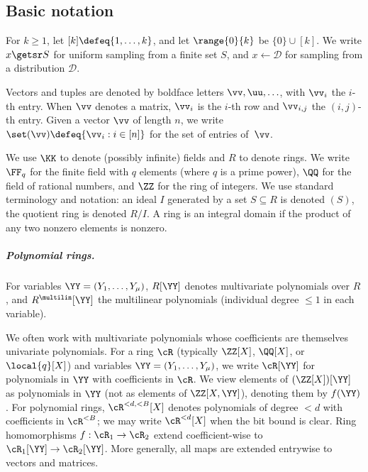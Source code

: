 \subsection{Basic notation}
\label{sec:zinc-crypto-preliminaries}



For $k\geq 1$, let $[k]\defeq \{1,\ldots, k\}$, and let $\range{0}{k}$ be $\{0\}\cup[k]$. We write $x\getsr S$ for uniform sampling from a finite set $S$, and $x\gets\mathcal{D}$ for sampling from a distribution $\mathcal{D}$.


 Vectors and tuples are denoted by boldface letters $\vv, \uu, \ldots$, with $\vv_i$ the $i$-th entry. When $\vv$ denotes a matrix, $\vv_{i}$ is the $i$-th row and $\vv_{i,j}$ the $(i,j)$-th entry.
Given a vector $\vv$ of length $n$, we write $\set(\vv)\defeq\{\vv_i:i\in[n]\}$ for the set of entries of~$\vv$. %




We use $\KK$ to denote (possibly infinite) fields and $R$ to denote rings. We write $\FF_q$ for the finite field with $q$ elements (where $q$ is a prime power), $\QQ$ for the field of rational numbers, and $\ZZ$ for the ring of integers. We use standard terminology and notation: an ideal $I$ generated by a set $S\subseteq R$ is denoted $(S)$, the quotient ring is denoted $R/I$. A ring is an integral domain if the product of any two nonzero elements is nonzero. 



\subparagraph{Polynomial rings.}
For variables $\YY=(Y_1,\ldots, Y_\mu)$, $R[\YY]$ denotes multivariate polynomials over $R$, and $R^{\multilin}[\YY]$ the multilinear polynomials (individual degree $\le 1$ in each variable).

We often work with multivariate polynomials whose coefficients are themselves univariate polynomials. For a ring $\cR$ (typically $\ZZ[X]$, $\QQ[X]$, or $\local{q}[X]$) and variables $\YY=(Y_1,\ldots, Y_\mu)$, we write $\cR[\YY]$ for polynomials in $\YY$ with coefficients in $\cR$. We view elements of $(\ZZ[X])[\YY]$ as polynomials in $\YY$ (not as elements of $\ZZ[X,\YY]$), denoting them by $f(\YY)$.
For polynomial rings, $\cR^{<d, <B}[X]$ denotes polynomials of degree $<d$ with coefficients in $\cR^{<B}$; we may write $\cR^{<d}[X]$ when the bit bound is clear.
Ring homomorphisms $f:\cR_1 \to \cR_2$ extend coefficient-wise to $\cR_1[\YY] \to \cR_2[\YY]$.
More generally, all maps are extended entrywise to vectors and matrices.



